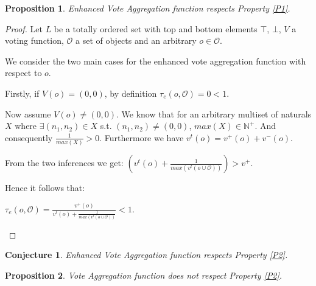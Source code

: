 \documentclass{article}
\newtheorem{proposition}{Proposition}
\newtheorem{conjecture}{Conjecture}
\newcommand{\nat}{\mathbb{N}}   %
\newcommand{\valueset}{L}
\newcommand{\obj}{\mathcal{O}} %
\begin{document}





\begin{proposition}
Enhanced Vote Aggregation function respects Property \ref{P1}.
\end{proposition}

\begin{proof} %
Let  $\valueset$ be a totally ordered set with top and bottom elements $\top$, $\bot$, $V$ a voting function, $\obj$ a set of objects and an arbitrary $o \in \obj$.

We consider the two main cases for the enhanced vote aggregation function with respect to $o$.

Firstly, if $V(o) = (0,0)$, by definition $\tau_{e}(o, \obj) = 0 < 1$.

Now assume $V(o) \neq (0,0)$. We know that for an arbitrary multiset of naturals $X$ where $\exists (n_1,n_2) \in X$ s.t. $(n_1,n_2) \neq (0,0)$, $max(X)  \in \nat^+$. And consequently $\frac{1}{max(X)} > 0$. Furthermore we have $v^{t}(o) = v^{+}(o) + v^{-}(o)$.

From the two inferences we get: $(v^{t}(o)+\frac{1}{max(v^{t}(o \cup \mathcal{O}))}) > v^{+}$.

Hence it follows that: \\
\begin{center}
$ \tau_{e}(o,  \obj) = \frac{v^{+}(o)}{v^{t}(o)+\frac{1}{max(v^{t}(o \cup \mathcal{O}))}} < 1$.
\end{center}
\end{proof}

\begin{conjecture}
Enhanced Vote Aggregation function respects Property \ref{P2}.
\end{conjecture}

\begin{proposition}
Vote Aggregation function\cite{eml2013esaf} does not respect Property \ref{P2}.
\end{proposition}
\end{document}
